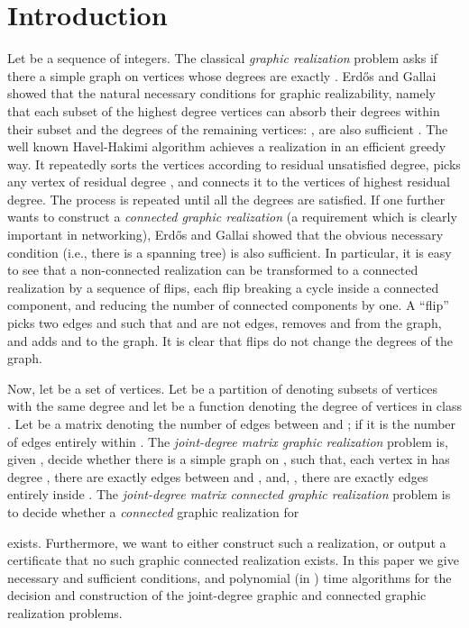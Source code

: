 \documentclass[12pt,a4paper]{article}
\theoremstyle{definition}
\theoremstyle{plain}
\begin{document}
\section{Introduction}
\label{sec:introduction}

Let  be a sequence of integers.
The classical {\it graphic realization} problem asks
if there a simple graph on  vertices
whose degrees are exactly .
Erd\H{o}s and Gallai
showed that the natural necessary conditions for graphic realizability,
namely that each subset of the highest  degree vertices can absorb
their degrees within their subset and the degrees of the remaining vertices:
,
are also sufficient \cite{ErdosGallai,bergebook}.
The well known Havel-Hakimi
algorithm \cite{HavelHakimi1,HavelHakimi2} achieves
a realization
in an efficient greedy way. It repeatedly sorts the vertices according
to residual unsatisfied degree, picks any vertex
of residual degree ,
and connects it to the  vertices of highest residual degree.
The process is repeated until all the degrees are satisfied.
If one further wants to construct a {\it connected graphic realization}
(a requirement which is clearly important in networking),
Erd\H{o}s and Gallai showed that
the obvious necessary condition 
(i.e., there is a spanning tree) is also sufficient.
In particular, it is easy to see that a non-connected realization
can be transformed to a connected
realization by a sequence of flips, each flip breaking a cycle inside
a connected component, and reducing the number of
connected components by one.
A  ``flip''
picks two edges   and 
such that  and  are not edges,
removes  and  from the graph,
and adds  and  to the graph.
It is clear that flips do
not change the degrees of the graph.

Now, let  be a set of vertices.
Let 
be a partition of  denoting
subsets of vertices with the same degree and let 
be a function denoting the degree
of vertices in class .
Let  be a  matrix
denoting the number of edges between  and ;
if  it is the number of edges entirely within .
The {\it joint-degree matrix graphic realization} problem is,
given , decide
whether there is a simple graph  on , such that,
 each vertex in  has degree , 
 there are exactly  edges between  and ,
and, , there are exactly  edges entirely inside .
The {\it joint-degree matrix connected graphic realization} problem
is to decide whether a \emph{connected} graphic realization for 

exists. Furthermore, we want to either construct such a realization,
or output a certificate that no such graphic connected realization 
exists.
In this paper we give necessary and sufficient conditions, and polynomial (in ) time algorithms
for the decision and construction of the joint-degree graphic
and connected graphic realization problems.
\end{document}
